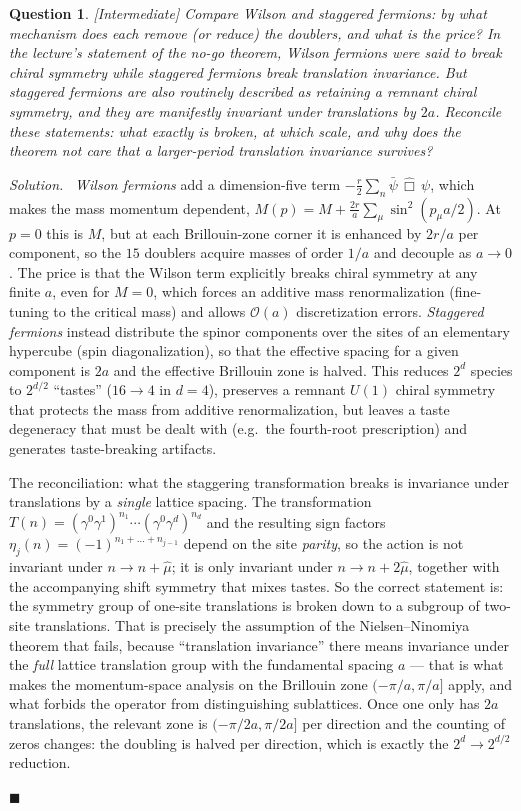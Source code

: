 \documentclass[11pt]{article}
\newcommand{\diff}[1]{\textcolor{blue!60!black}{\footnotesize\textsf{[#1]}}\quad}
\newtheorem{question}{Question}
\newenvironment{solution}{\par\smallskip\noindent\textit{Solution.}\ }{\hfill$\blacksquare$\par\smallskip}
\begin{document}
\begin{question}
\diff{Intermediate} Compare Wilson and staggered fermions: by what mechanism does each remove (or reduce) the doublers, and what is the price? In the lecture's statement of the no-go theorem, Wilson fermions were said to break \emph{chiral symmetry} while staggered fermions break \emph{translation invariance}. But staggered fermions are also routinely described as retaining a remnant chiral symmetry, and they are manifestly invariant under translations by $2a$. Reconcile these statements: what exactly is broken, at which scale, and why does the theorem not care that a larger-period translation invariance survives?
\end{question}
\begin{solution}
\emph{Wilson fermions} add a dimension-five term $-\frac{r}{2}\sum_n \bar\psi\,\hat\Box\,\psi$, which makes the mass momentum dependent, $M(p) = M + \frac{2r}{a}\sum_\mu \sin^2(p_\mu a/2)$. At $p=0$ this is $M$, but at each Brillouin-zone corner it is enhanced by $2r/a$ per component, so the $15$ doublers acquire masses of order $1/a$ and decouple as $a\to0$. The price is that the Wilson term explicitly breaks chiral symmetry at any finite $a$, even for $M=0$, which forces an additive mass renormalization (fine-tuning to the critical mass) and allows $\mathcal{O}(a)$ discretization errors. \emph{Staggered fermions} instead distribute the spinor components over the sites of an elementary hypercube (spin diagonalization), so that the effective spacing for a given component is $2a$ and the effective Brillouin zone is halved. This reduces $2^d$ species to $2^{d/2}$ ``tastes'' ($16 \to 4$ in $d=4$), preserves a remnant $U(1)$ chiral symmetry that protects the mass from additive renormalization, but leaves a taste degeneracy that must be dealt with (e.g.\ the fourth-root prescription) and generates taste-breaking artifacts.

The reconciliation: what the staggering transformation breaks is invariance under translations by a \emph{single} lattice spacing. The transformation $T(n) = (\gamma^0\gamma^1)^{n_1}\cdots(\gamma^0\gamma^d)^{n_d}$ and the resulting sign factors $\eta_j(n) = (-1)^{n_1+\dots+n_{j-1}}$ depend on the site \emph{parity}, so the action is not invariant under $n \to n+\hat\mu$; it is only invariant under $n \to n + 2\hat\mu$, together with the accompanying shift symmetry that mixes tastes. So the correct statement is: the symmetry group of one-site translations is broken down to a subgroup of two-site translations. That is precisely the assumption of the Nielsen--Ninomiya theorem that fails, because ``translation invariance'' there means invariance under the \emph{full} lattice translation group with the fundamental spacing $a$ --- that is what makes the momentum-space analysis on the Brillouin zone $(-\pi/a,\pi/a]$ apply, and what forbids the operator from distinguishing sublattices. Once one only has $2a$ translations, the relevant zone is $(-\pi/2a,\pi/2a]$ per direction and the counting of zeros changes: the doubling is halved per direction, which is exactly the $2^d \to 2^{d/2}$ reduction.


\end{solution}
\end{document}
